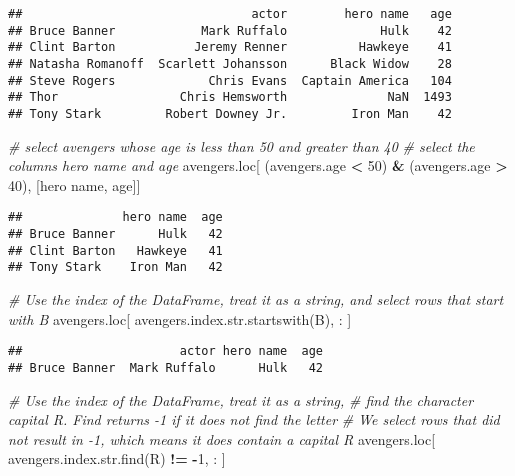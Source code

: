 \documentclass[
]{book}
\newenvironment{Shaded}{\begin{snugshade}}{\end{snugshade}}
\newcommand{\BuiltInTok}[1]{#1}
\newcommand{\CommentTok}[1]{\textcolor[rgb]{0.56,0.35,0.01}{\textit{#1}}}
\newcommand{\DecValTok}[1]{\textcolor[rgb]{0.00,0.00,0.81}{#1}}
\newcommand{\NormalTok}[1]{#1}
\newcommand{\OperatorTok}[1]{\textcolor[rgb]{0.81,0.36,0.00}{\textbf{#1}}}
\newcommand{\StringTok}[1]{\textcolor[rgb]{0.31,0.60,0.02}{#1}}
\begin{document}
\begin{verbatim}
##                                actor        hero name   age
## Bruce Banner            Mark Ruffalo             Hulk    42
## Clint Barton           Jeremy Renner          Hawkeye    41
## Natasha Romanoff  Scarlett Johansson      Black Widow    28
## Steve Rogers             Chris Evans  Captain America   104
## Thor                 Chris Hemsworth              NaN  1493
## Tony Stark         Robert Downey Jr.         Iron Man    42
\end{verbatim}

\begin{Shaded}
\begin{Highlighting}[]
\CommentTok{\# select avengers whose age is less than 50 and greater than 40}
\CommentTok{\# select the columns \textquotesingle{}hero name\textquotesingle{} and \textquotesingle{}age\textquotesingle{}}
\NormalTok{avengers.loc[ (avengers.age }\OperatorTok{\textless{}} \DecValTok{50}\NormalTok{) }\OperatorTok{\&}\NormalTok{ (avengers.age }\OperatorTok{\textgreater{}} \DecValTok{40}\NormalTok{), [}\StringTok{\textquotesingle{}hero name\textquotesingle{}}\NormalTok{, }\StringTok{\textquotesingle{}age\textquotesingle{}}\NormalTok{]]}
\end{Highlighting}
\end{Shaded}

\begin{verbatim}
##              hero name  age
## Bruce Banner      Hulk   42
## Clint Barton   Hawkeye   41
## Tony Stark    Iron Man   42
\end{verbatim}

\begin{Shaded}
\begin{Highlighting}[]
\CommentTok{\# Use the index of the DataFrame, treat it as a string, and select rows that start with B}
\NormalTok{avengers.loc[ avengers.index.}\BuiltInTok{str}\NormalTok{.startswith(}\StringTok{\textquotesingle{}B\textquotesingle{}}\NormalTok{), : ]}
\end{Highlighting}
\end{Shaded}

\begin{verbatim}
##                      actor hero name  age
## Bruce Banner  Mark Ruffalo      Hulk   42
\end{verbatim}

\begin{Shaded}
\begin{Highlighting}[]
\CommentTok{\# Use the index of the DataFrame, treat it as a string,}
\CommentTok{\# find the character capital R. Find returns {-}1 if it does not find the letter}
\CommentTok{\# We select rows that did not result in {-}1, which means it does contain a capital R}
\NormalTok{avengers.loc[ avengers.index.}\BuiltInTok{str}\NormalTok{.find(}\StringTok{\textquotesingle{}R\textquotesingle{}}\NormalTok{) }\OperatorTok{!=} \OperatorTok{{-}}\DecValTok{1}\NormalTok{, : ]}
\end{Highlighting}
\end{Shaded}
\end{document}
